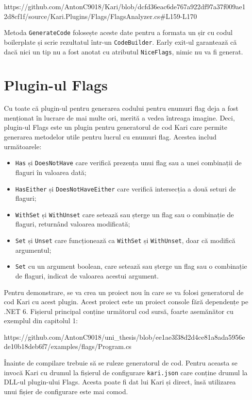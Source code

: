 \documentclass[a4paper,12pt]{report}
\begin{document}
https://github.com/AntonC9018/Kari/blob/dcfd36eac6de767a922df97a37f009ae12d8cf1f/source/Kari.Plugins/Flags/FlagsAnalyzer.cs#L159-L170

Metoda \texttt{GenerateCode\(\)} folosește aceste date pentru a formata un șir cu codul boilerplate și scrie rezultatul într-un \texttt{CodeBuilder}.
Early exit-ul garantează că dacă nici un tip nu a fost anotat cu atributul \texttt{NiceFlags}, nimic nu va fi generat.


\section{Plugin-ul Flags}

Cu toate că plugin-ul pentru generarea codului pentru enumuri flag deja a fost menționat în lucrare de mai multe ori, merită a vedea întreaga imagine.
Deci, plugin-ul Flags este un plugin pentru generatorul de cod Kari care permite generarea metodelor utile pentru lucrul cu enumuri flag.
Acestea includ următoarele:

\begin{itemize}
  \item \texttt{Has} și \texttt{DoesNotHave} care verifică prezența unui flag sau a unei combinații de flaguri în valoarea dată;
  \item \texttt{HasEither} și \texttt{DoesNotHaveEither} care verifică intersecția a două seturi de flaguri;
  \item \texttt{WithSet} și \texttt{WithUnset} care setează sau șterge un flag sau o combinație de flaguri, returnând valoarea modificată;
  \item \texttt{Set} și \texttt{Unset} care funcționează ca \texttt{WithSet} și \texttt{WithUnset}, doar că modifică argumentul;
  \item \texttt{Set} cu un argument boolean, care setează sau șterge un flag sau o combinație de flaguri, indicat de valoarea acestui argument.
\end{itemize}

Pentru demonstrare, se va crea un proiect nou în care se va folosi generatorul de cod Kari cu acest plugin.
Acest proiect este un proiect console fără dependențe pe .NET 6.
Fișierul principal conține următorul cod sursă, foarte asemănător cu exemplul din capitolul 1:

https://github.com/AntonC9018/uni_thesis/blob/ee1ae3f38d2d4ce81a8ada5956ede10b18deb6f7/examples/flags/Program.cs


Înainte de compilare trebuie să se ruleze generatorul de cod.
Pentru aceasta se invocă Kari cu drumul la fișierul de configurare \texttt{kari.json} care conține drumul la DLL-ul plugin-ului Flags.
Acesta poate fi dat lui Kari și direct, însă utilizarea unui fișier de configurare este mai comod.
\end{document}
